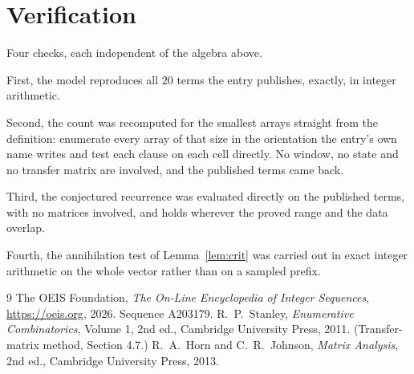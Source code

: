 \documentclass[11pt,a4paper]{article}
\theoremstyle{plain}
\theoremstyle{definition}
\begin{document}
\section{Verification}

Four checks, each independent of the algebra above.

First, the model reproduces all $20$ terms the entry publishes, exactly, in integer
arithmetic.

Second, the count was recomputed for the smallest arrays straight from the definition:
enumerate every array of that size in the orientation the entry's own name writes and test each
clause on each cell directly. No window, no state and no transfer matrix are involved, and the
published terms came back.

Third, the conjectured recurrence was evaluated directly on the published terms, with no
matrices involved, and holds wherever the proved range and the data overlap.

Fourth, the annihilation test of Lemma~\ref{lem:crit} was carried out in exact integer
arithmetic on the whole vector rather than on a sampled prefix.

\begin{thebibliography}{9}
 The OEIS Foundation, \emph{The On-Line Encyclopedia of Integer
Sequences}, \url{https://oeis.org}, 2026. Sequence A203179.
 R.~P.~Stanley, \emph{Enumerative Combinatorics}, Volume 1, 2nd ed.,
Cambridge University Press, 2011. (Transfer-matrix method, Section 4.7.)
 R.~A.~Horn and C.~R.~Johnson, \emph{Matrix Analysis}, 2nd ed., Cambridge
University Press, 2013.
\end{thebibliography}
\end{document}
